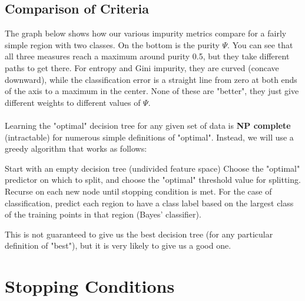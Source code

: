 \documentclass[11pt,a4paper]{report}
\begin{document}
\subsection{Comparison of Criteria}
The graph below shows how our various impurity metrics compare for a fairly simple region with two classes. On the bottom is the purity $\Psi$. 
You can see that all three measures reach a maximum around purity 0.5, but they take different paths to get there. For entropy and Gini impurity, they are curved (concave downward), while the classification error is a straight line from zero at both ends of the axis to a maximum in the center. None of these are "better", they just give different weights to different values of $\Psi$.\\
\\
Learning the "optimal" decision tree for any given set of data is \textbf{NP complete} (intractable) for numerous simple definitions of "optimal". Instead, we will use a greedy algorithm that works as follows:
\begin{algorithm}[H]
\begin{algorithmic}[1]
   \State Start with an empty decision tree (undivided feature space)
   \State Choose the "optimal" predictor on which to split, and choose the "optimal" threshold value for splitting.
	\State Recurse on each new node until stopping condition is met.
	\State For the case of classification, predict each region to have a class label based on the largest class of the training points in that region (Bayes' classifier).
\end{algorithmic}
\end{algorithm}
This is not guaranteed to give us the best decision tree (for any particular definition of "best"), but it is very likely to give us a good one.
\section{Stopping Conditions}
\end{document}
